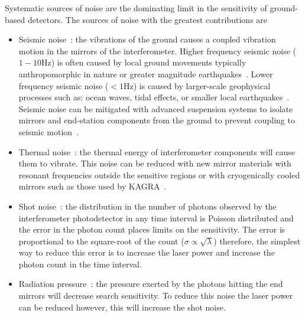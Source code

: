 Systematic sources of noise are the dominating limit in the sensitivity of ground-based detectors. The sources of noise with the greatest contributions are
%
\begin{itemize}
    \item Seismic noise~\cite{Glanzer:2023}: the vibrations of the ground causes a coupled vibration motion in the mirrors of the interferometer. Higher frequency seismic noise ($1-10$Hz) is often caused by local ground movements typically anthropomorphic in nature or greater magnitude earthquakes~\cite{Nuttall:2018}. Lower frequency seismic noise ($<1$Hz) is caused by larger-scale geophysical processes such as: ocean waves, tidal effects, or smaller local earthquakes~\cite{aLIGO:2015}. Seismic noise can be mitigated with advanced suspension systems to isolate mirrors and end-station components from the ground to prevent coupling to seismic motion~\cite{seismic_isolation:2015}.
    \item Thermal noise~\cite{thermal_noise:2018}: the thermal energy of interferometer components will cause them to vibrate. This noise can be reduced with new mirror materials with resonant frequencies outside the sensitive regions or with cryogenically cooled mirrors such as those used by KAGRA~\cite{KAGRA:2021}.
    \item Shot noise~\cite{quantum_noise:2003}: the distribution in the number of photons observed by the interferometer photodetector in any time interval is Poisson distributed and the error in the photon count places limits on the sensitivity. The error is proportional to the square-root of the count ($\sigma \propto \sqrt{\lambda}$) therefore, the simplest way to reduce this error is to increase the laser power and increase the photon count in the time interval.
    \item Radiation pressure~\cite{quantum_noise:2003}: the pressure exerted by the photons hitting the end mirrors will decrease search sensitivity. To reduce this noise the laser power can be reduced however, this will increase the shot noise.
\end{itemize}


